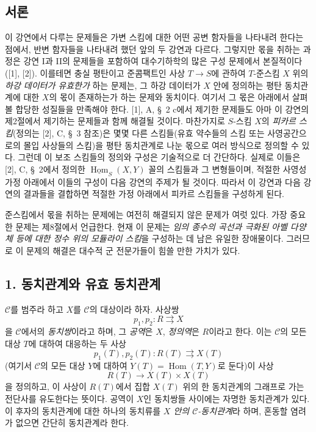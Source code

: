 \documentclass[11pt,twoside,openany]{book}
\numberwithin{equation}{section}
\newcommand{\sourceunit}{front}
\newcommand{\src}[1]{%
  \phantomsection\hypertarget{src:\sourceunit:#1}{}%
  \marginpar{\raggedleft\footnotesize\sffamily #1}%
}
\theoremstyle{plain}
\theoremstyle{definition}
\theoremstyle{remark}
\begin{document}
\subsection*{서론}

이 강연에서 다루는 문제들은 가변 스킴에 대한 어떤 공변 함자들을
나타내려 한다는 점에서, 반변 함자들을 나타내려 했던 앞의 두 강연과
다르다. 그렇지만 몫을 취하는 과정은 강연 I과 II의 문제들을 포함하여
대수기하학의 많은 구성 문제에서 본질적이다([1], [2]). 이를테면 충실
평탄이고 준콤팩트인 사상 $T\longrightarrow S$에 관하여 $T$-준스킴
$X$ 위의 \emph{하강 데이터가 유효한가} 하는 문제는, 그 하강 데이터가
$X$ 안에 정의하는 평탄 동치관계에 대한 $X$의 몫이 존재하는가 하는
문제와 동치이다. 여기서 그 몫은 아래에서 살펴볼 합당한 성질들을
만족해야 한다. [1], A, \S~2 c에서 제기한 문제들도 아마 이 강연의
제2절에서 제기하는 문제들과 함께 해결될 것이다. 마찬가지로
$S$-스킴 $X$의 \emph{피카르 스킴}(정의는 [2], C, \S~3 참조)은
몇몇 다른 스킴들(유효 약수들의 스킴 또는 사영공간으로의 몰입 사상들의
스킴)을 평탄 동치관계로 나눈 몫으로 여러 방식으로 정의할 수 있다.
그런데 이 보조 스킴들의 정의와 구성은 기술적으로 더 간단하다. 실제로
이들은 [2], C, \S~2에서 정의한
$\underline{\operatorname{Hom}}_S(X,Y)$ 꼴의 스킴들과 그 변형들이며,
적절한 사영성 가정 아래에서 이들의 구성이 다음 강연의 주제가 될
것이다. 따라서 이 강연과 다음 강연의 결과들을 결합하면 적절한 가정
아래에서 피카르 스킴들을 구성하게 된다.

준스킴에서 몫을 취하는 문제에는 여전히 해결되지 않은 문제가 여럿
있다. 가장 중요한 문제는 제8절에서 언급한다. 현재 이 문제는
\emph{임의 종수의 곡선과 극화된 아벨 다양체 등에 대한 정수 위의
모듈라이 스킴}을 구성하는 데 남은 유일한 장애물이다. 그러므로 이
문제의 해결은 대수적 군 전문가들이 힘쓸 만한 가치가 있다.

\src{100}
\subsection*{1. 동치관계와 유효 동치관계}

$\mathcal C$를 범주라 하고 $X$를 $\mathcal C$의 대상이라 하자. 사상쌍
\[
  p_1,p_2:R\rightrightarrows X
\]
을 $\mathcal C$에서의 \emph{동치쌍}이라고 하며, 그 \emph{공역}은
$X$, \emph{정의역}은 $R$이라고 한다. 이는 $\mathcal C$의 모든 대상
$T$에 대하여 대응하는 두 사상
\[
  p_1(T),p_2(T):R(T)\rightrightarrows X(T)
\]
(여기서 $\mathcal C$의 모든 대상 $Y$에 대하여
$Y(T)=\operatorname{Hom}(T,Y)$로 둔다)이 사상
\[
  R(T)\longrightarrow X(T)\times X(T)
\]
을 정의하고, 이 사상이 $R(T)$에서 집합 $X(T)$ 위의 한 동치관계의
그래프로 가는 전단사를 유도한다는 뜻이다. 공역이 $X$인 동치쌍들
사이에는 자명한 동치관계가 있다. 이 후자의 동치관계에 대한 하나의
동치류를 \emph{$X$ 안의 $\mathcal C$-동치관계}라 하며, 혼동할
염려가 없으면 간단히 동치관계라 한다.
\end{document}
